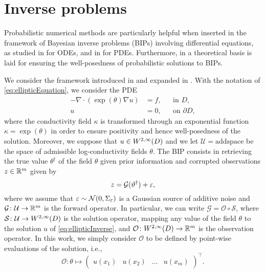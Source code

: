 \documentclass[10pt]{article}
\begin{document}
\section{Inverse problems}\label{sec:inverseproblems}

Probabilistic numerical methods are particularly helpful when inserted in the framework of Bayesian inverse problems (BIPs) involving differential equations, as studied in \cite{AbG18, CGS17} for ODEs, and in \cite{COS17, CCC16} for PDEs. Furthermore, in \cite{LST18} a theoretical basis is laid for ensuring the well-posedness of probabilistic solutions to BIPs.

We consider the framework introduced in \cite{Stu10} and expanded in \cite{DaS11}. With the notation of \eqref{eq:ellipticEquation}, we consider the PDE
\begin{equation}\label{eq:ellipticInverse}
\begin{aligned}
	-\nabla \cdot (\exp(\theta) \nabla u) &= f, &&\text{in } D,\\
	u &= 0, &&\text{on } \partial D,
\end{aligned}
\end{equation}
where the conductivity field $\kappa$ is transformed through an exponential function $\kappa = \exp(\theta)$ in order to ensure positivity and hence well-posedness of the solution. Moreover, we suppose that $u \in W^{2, \infty}(D)$ and we let $\mathcal U = \mathrm{add space}$ be the space of admissible log-conductivity fields $\theta$. The BIP consists in retrieving the true value $\theta^\dagger$ of the field $\theta$ given prior information and corrupted observations $z \in \mathbb{R}^m$ given by
\begin{equation}
	z = \mathcal G(\vartheta^\dagger) + \varepsilon,
\end{equation}
where we assume that $\varepsilon \sim \mathcal N(0, \Sigma_\varepsilon)$ is a Gaussian source of additive noise and $\mathcal G \colon \mathcal U \to \mathbb{R}^m$ is the forward operator. In particular, we can write $\mathcal G = \mathcal O \circ \mathcal S$, where $\mathcal S \colon \mathcal U  \to W^{2, \infty}(D)$ is the solution operator, mapping any value of the field $\theta$ to the solution $u$ of \eqref{eq:ellipticInverse}, and $\mathcal O \colon W^{2, \infty}(D) \to \mathbb{R}^m$ is the observation operator. In this work, we simply consider $\mathcal O$ to be defined by point-wise evaluations of the solution, i.e., 
\begin{equation}
\mathcal O\colon \theta \mapsto \begin{pmatrix} u(x_1) & u(x_2) & \ldots & u(x_m) \end{pmatrix}^\top.
\end{equation} 
\end{document}
